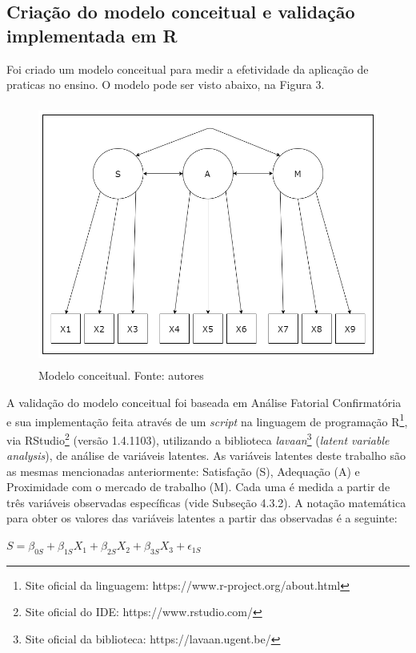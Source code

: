 \subsection{Criação do modelo conceitual e validação implementada em R}

Foi criado um modelo conceitual para medir a efetividade da aplicação de praticas no ensino. O modelo pode ser visto abaixo, na Figura 3.  

\begin{figure}[!ht]
    \centering
    \includegraphics[width=12cm,height=8.6cm]{Imagens/ModeloConceitualTCC.png}
    \caption{Modelo conceitual. Fonte: autores}
    \label{fig:ModeloConceitualTCC}
\end{figure}

A validação do modelo conceitual foi baseada em Análise Fatorial Confirmatória e sua implementação feita através de um \textit{script} na linguagem de programação R\footnote{Site oficial da linguagem: https://www.r-project.org/about.html}, via RStudio\footnote{Site oficial do IDE: https://www.rstudio.com/} (versão 1.4.1103), utilizando a biblioteca \textit{lavaan}\footnote{Site oficial da biblioteca: https://lavaan.ugent.be/} (\textit{latent variable analysis}), de análise de variáveis latentes. As variáveis latentes deste trabalho são as mesmas mencionadas anteriormente: Satisfação (S), Adequação (A) e Proximidade com o mercado de trabalho (M). Cada uma é medida a partir de três variáveis observadas específicas (vide Subseção 4.3.2). A notação matemática para obter os valores das variáveis latentes a partir das observadas é a seguinte:

$S = \beta_{0S} + \beta_{1S}X_{1} + \beta_{2S}X_{2} + \beta_{3S}X_{3} + \epsilon_{1S}$

